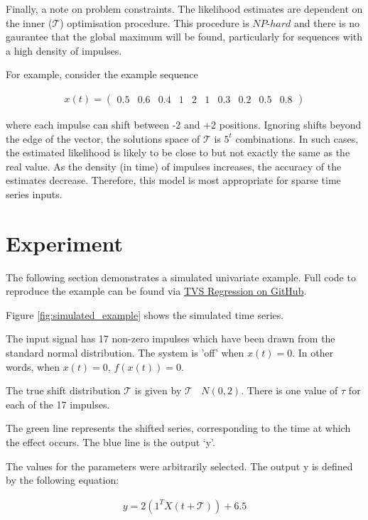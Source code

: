 \documentclass[11pt]{amsart}
\begin{document}
Finally, a note on problem constraints. The likelihood estimates are dependent on the inner ($\mathcal{T}$) optimisation procedure. This procedure is $NP$-$hard$ and there is no gaurantee that the global maximum will be found, particularly for sequences with a high density of impulses. 

For example, consider the example sequence 

\begin{align}
    x(t) = 
    \left(
\begin{array}{cccccccccc}
    0.5 & 0.6 & 0.4 & 1 & 2 & 1 &
    0.3 & 0.2 & 0.5 & 0.8 
\end{array}  
\right)
\end{align}

where each impulse can shift between -2 and +2 positions. Ignoring shifts beyond the edge of the vector, the solutions space of $\mathcal{T}$ is $5^t$ combinations.  
In such cases, the estimated likelihood is likely to be close to but not exactly the same as the real value. As the density (in time) of impulses increases, the accuracy of the estimates decrease. Therefore, this model is most appropriate for sparse time series inputs.

\section{Experiment}

The following section demonstrates a simulated univariate example. Full code to reproduce the example can be found via \href{https://github.com/aaron1rcl/tvs_regression/}{TVS Regression on GitHub}.

Figure \ref{fig:simulated_example} shows the simulated time series.

The input signal has 17 non-zero impulses which have been drawn from the standard normal distribution. The system is 'off' when $x(t) =0$. In other words, when $x(t) = 0$, $f(x(t)) = 0$. 

The true shift distribution $\mathcal{T}$ is given by $\mathcal{T}$ $~$ $N(0, 2)$. There is one value of $\tau$ for each of the 17 impulses.

The green line represents the shifted series, corresponding to the time at which the effect occurs. The blue line is the output ‘y’.

The values for the parameters were arbitrarily selected. The output y is defined by the following equation:


\begin{align}
    y = 2(1^TX(t + \mathcal{T})) + 6.5
\end{align}
\end{document}
